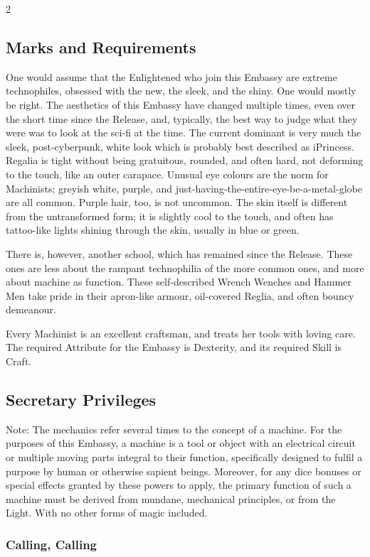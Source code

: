\begin{multicols}{2}
\subsection*{Marks and Requirements}
One would assume that the Enlightened who join this Embassy are extreme technophiles, obsessed with the new, the sleek, and the shiny. One would mostly be right. The aesthetics of this Embassy have changed multiple times, even over the short time since the Release, and, typically, the best way to judge what they were was to look at the sci-fi at the time. The current dominant is very much the sleek, post-cyberpunk, white look which is probably best described as iPrincess. Regalia is tight without being gratuitous, rounded, and often hard, not deforming to the touch, like an outer carapace. Unusual eye colours are the norm for Machinists; greyish white, purple, and just-having-the-entire-eye-be-a-metal-globe are all common. Purple hair, too, is not uncommon. The skin itself is different from the untransformed form; it is slightly cool to the touch, and often has tattoo-like lights shining through the skin, usually in blue or green.

There is, however, another school, which has remained since the Release. These ones are less about the rampant technophilia of the more common ones, and more about machine as function. These self-described Wrench Wenches and Hammer Men take pride in their apron-like armour, oil-covered Reglia, and often bouncy demeanour.

Every Machinist is an excellent craftsman, and treats her tools with loving care. The required Attribute for the Embassy is Dexterity, and its required Skill is Craft. 
\subsection*{Secretary Privileges}
Note: The mechanics refer several times to the concept of a machine. For the purposes of this Embassy, a machine is a tool or object with an electrical circuit or multiple moving parts integral to their function, specifically designed to fulfil a purpose by human or otherwise sapient beings. Moreover, for any dice bonuses or special effects granted by these powers to apply, the primary function of such a machine must be derived from mundane, mechanical principles, or from the Light. With no other forms of magic included. 
\subsubsection*{Calling, Calling}


\end{multicols}
